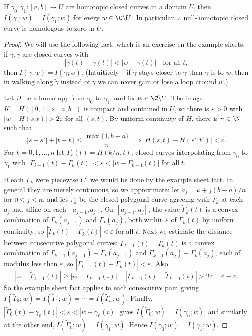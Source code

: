 \begin{theorem}
    If $\gamma_0, \gamma_1: [a, b] \rightarrow U$ are homotopic closed curves in a domain $U$, then $I(\gamma_0; w) = I(\gamma_1; w)$ for every $w \in \C \backslash U$. In particular, a null-homotopic closed curve is homologous to zero in $U$.
\end{theorem}
\begin{proof}
    We will use the following fact, which is an exercise on the example sheets: if $\gamma, \tilde{\gamma}$ are closed curves with
    $$
    |\gamma(t) - \tilde{\gamma}(t)| < |w - \gamma(t)| \quad \text{for all } t,
    $$
    then $I(\gamma; w) = I(\tilde{\gamma}; w)$. (Intuitively -- if $\tilde\gamma$ stays closer to $\gamma$ than $\gamma$ is to $w$, then in walking along $\tilde{\gamma}$ instead of $\gamma$ we can never gain or lose a loop around $w$.)

    Let $H$ be a homotopy from $\gamma_0$ to $\gamma_1$, and fix $w \in \C \backslash U$. The image $K = H([0,1]\times[a,b])$ is compact and contained in $U$, so there is $\varepsilon > 0$ with $|w - H(s, t)| > 2\varepsilon$ for all $(s, t)$. By uniform continuity of $H$, there is $n \in \N$ such that
    $$
    |s - s'| + |t - t'| \leq \frac{\max\{1, b - a\}}{n} \implies |H(s, t) - H(s', t')| < \varepsilon.
    $$
    For $k = 0, 1, \dots, n$ let $\Gamma_k(t) = H(k/n, t)$, closed curves interpolating from $\gamma_0$ to $\gamma_1$ with $|\Gamma_{k - 1}(t) - \Gamma_k(t)| < \varepsilon < |w - \Gamma_{k-1}(t)|$ for all $t$.

    If each $\Gamma_k$ were piecewise $C^1$ we would be done by the example sheet fact. In general they are merely continuous, so we approximate: let $a_j = a + j(b - a)/n$ for $0 \leq j \leq n$, and let $\tilde{\Gamma}_k$ be the closed polygonal curve agreeing with $\Gamma_k$ at each $a_j$ and affine on each $[a_{j - 1}, a_j]$. On $[a_{j-1}, a_j]$, the value $\tilde{\Gamma}_k(t)$ is a convex combination of $\Gamma_k(a_{j - 1})$ and $\Gamma_k(a_j)$, both within $\varepsilon$ of $\Gamma_k(t)$ by uniform continuity; so $|\tilde{\Gamma}_k(t) - \Gamma_k(t)| < \varepsilon$ for all $t$. Next we estimate the distance between consecutive polygonal curves: $\tilde{\Gamma}_{k-1}(t) - \tilde{\Gamma}_k(t)$ is a convex combination of $\Gamma_{k-1}(a_{j-1}) - \Gamma_k(a_{j-1})$ and $\Gamma_{k-1}(a_j) - \Gamma_k(a_j)$, each of modulus less than $\varepsilon$, so $|\tilde{\Gamma}_{k-1}(t) - \tilde{\Gamma}_k(t)| < \varepsilon$. Also
    $$
    |w - \tilde{\Gamma}_{k - 1}(t)| \geq |w - \Gamma_{k - 1}(t)| - |\Gamma_{k-1}(t) - \tilde{\Gamma}_{k-1}(t)| > 2 \varepsilon - \varepsilon = \varepsilon.
    $$
    So the example sheet fact applies to each consecutive pair, giving $I(\tilde{\Gamma}_0; w) = I(\tilde{\Gamma}_1; w) = \cdots = I(\tilde{\Gamma}_n; w)$. Finally, $|\tilde{\Gamma}_0(t) - \gamma_0(t)| < \varepsilon < |w - \gamma_0(t)|$ gives $I(\tilde{\Gamma}_0; w) = I(\gamma_0; w)$, and similarly at the other end, $I(\tilde{\Gamma}_n; w) = I(\gamma_1; w)$. Hence $I(\gamma_0; w) = I(\gamma_1; w)$.


\end{proof}
